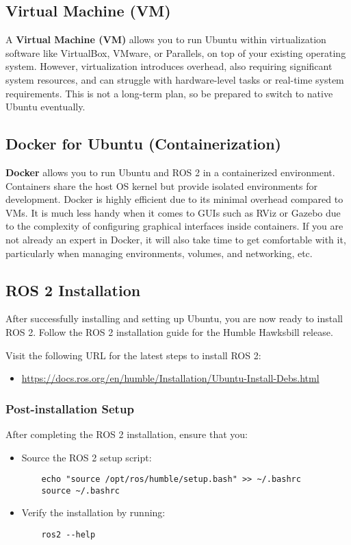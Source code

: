 \documentclass{article}
\begin{document}
\subsection{Virtual Machine (VM)}
A \textbf{Virtual Machine (VM)} allows you to run Ubuntu within virtualization software like VirtualBox, VMware, or Parallels, on top of your existing operating system. However, virtualization introduces overhead, also requiring significant system resources, and can struggle with hardware-level tasks or real-time system requirements. This is not a long-term plan, so be prepared to switch to native Ubuntu eventually.

\subsection{Docker for Ubuntu (Containerization)}
\textbf{Docker} allows you to run Ubuntu and ROS 2 in a containerized environment. Containers share the host OS kernel but provide isolated environments for development. Docker is highly efficient due to its minimal overhead compared to VMs. 
It is much less handy when it comes to GUIs such as RViz or Gazebo due to the complexity of configuring graphical interfaces inside containers. If you are not already an expert in Docker, it will also take time to get comfortable with it, particularly when managing environments, volumes, and networking, etc.

\subsection{ROS 2 Installation}
After successfully installing and setting up Ubuntu, you are now ready to install ROS 2. Follow the ROS 2 installation guide for the Humble Hawksbill release. 

Visit the following URL for the latest steps to install ROS 2:
\begin{itemize}
    \item \url{https://docs.ros.org/en/humble/Installation/Ubuntu-Install-Debs.html}
\end{itemize}

\subsubsection{Post-installation Setup}
After completing the ROS 2 installation, ensure that you:
\begin{itemize}
    \item Source the ROS 2 setup script:
    \begin{verbatim}
    echo "source /opt/ros/humble/setup.bash" >> ~/.bashrc
    source ~/.bashrc
    \end{verbatim}
    \item Verify the installation by running:
    \begin{verbatim}
    ros2 --help
    \end{verbatim}
\end{itemize}
\end{document}
